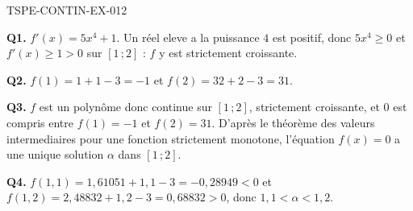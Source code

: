 \begin{corrige}{TSPE-CONTIN-EX-012}

\textbf{Q1.} $f'(x) = 5x^4 + 1$. Un réel eleve a la puissance $4$ est positif, donc $5x^4 \geq 0$ et $f'(x) \geq 1 > 0$ sur $[1\,;2]$ : $f$ y est strictement croissante.

\textbf{Q2.} $f(1) = 1 + 1 - 3 = -1$ et $f(2) = 32 + 2 - 3 = 31$.

\textbf{Q3.} $f$ est un polynôme donc continue sur $[1\,;2]$, strictement croissante, et $0$ est compris entre $f(1) = -1$ et $f(2) = 31$. D'après le théorème des valeurs intermediaires pour une fonction strictement monotone, l'équation $f(x) = 0$ a une unique solution $\alpha$ dans $[1\,;2]$.

\textbf{Q4.} $f(1{,}1) = 1{,}61051 + 1{,}1 - 3 = -0{,}28949 < 0$ et $f(1{,}2) = 2{,}48832 + 1{,}2 - 3 = 0{,}68832 > 0$, donc $1{,}1 < \alpha < 1{,}2$.
\end{corrige}
